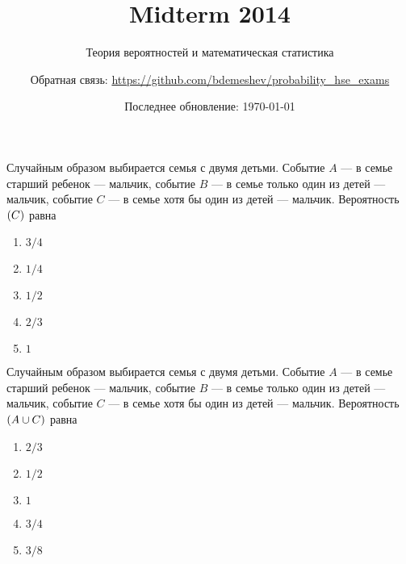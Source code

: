 \documentclass[t]{beamer}
\title{Midterm 2014}
\subtitle{Теория вероятностей и математическая статистика}
\author{Обратная связь: \url{https://github.com/bdemeshev/probability_hse_exams}}
\date{Последнее обновление: \today}
\let\P\relax
\DeclareMathOperator{\P}{\mathbb{P}}
\begin{document}
 

\frame[plain]{\titlepage}

 \begin{frame} \label{1} 
\begin{block}{1} 

Случайным образом выбирается семья с двумя детьми. Событие $A$ — в семье старший ребенок — мальчик,  событие $B$ — в семье только один из детей — мальчик, событие $C$ — в семье хотя бы один из детей — мальчик.  Вероятность $\P(C)$ равна
 


 \end{block} 
\begin{enumerate} 
\item[] \hyperlink{1-Yes}{\beamergotobutton{} $3/4$}
\item[] \hyperlink{1-No}{\beamergotobutton{} $1/4$}
\item[] \hyperlink{1-No}{\beamergotobutton{} $1/2$}
\item[] \hyperlink{1-No}{\beamergotobutton{} $2/3$
}
\item[] \hyperlink{1-No}{\beamergotobutton{} $1$}
\end{enumerate} 
\end{frame} 


 \begin{frame} \label{2} 
\begin{block}{2} 

Случайным образом выбирается семья с двумя детьми. Событие $A$ — в семье старший ребенок — мальчик,  событие $B$ — в семье только один из детей — мальчик, событие $C$ — в семье хотя бы один из детей — мальчик.  Вероятность $\P(A \cup C)$ равна
    


 \end{block} 
\begin{enumerate} 
\item[] \hyperlink{2-No}{\beamergotobutton{} $2/3$}
\item[] \hyperlink{2-No}{\beamergotobutton{} $1/2$
}
\item[] \hyperlink{2-No}{\beamergotobutton{} $1$}
\item[] \hyperlink{2-Yes}{\beamergotobutton{} $3/4$}
\item[] \hyperlink{2-No}{\beamergotobutton{} $3/8$}
\end{enumerate} 
\end{frame} 
\end{document}
